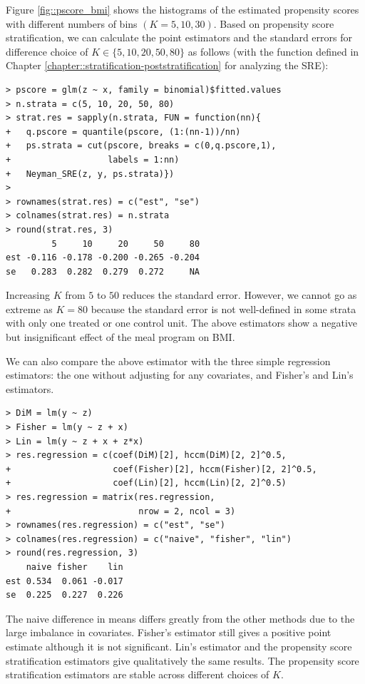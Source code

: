 Figure \ref{fig::pscore_bmi} shows the histograms of the estimated propensity scores with different numbers of bins $(K=5,10,30)$. 
Based on propensity score stratification, we can calculate the point estimators and the standard errors for difference choice of $K \in \{5, 10, 20, 50, 80 \}$ as follows (with the function  defined in Chapter \ref{chapter::stratification-poststratification} for analyzing the SRE):
\begin{lstlisting}
> pscore = glm(z ~ x, family = binomial)$fitted.values
> n.strata = c(5, 10, 20, 50, 80)
> strat.res = sapply(n.strata, FUN = function(nn){
+   q.pscore = quantile(pscore, (1:(nn-1))/nn)
+   ps.strata = cut(pscore, breaks = c(0,q.pscore,1), 
+                   labels = 1:nn)
+   Neyman_SRE(z, y, ps.strata)})
> 
> rownames(strat.res) = c("est", "se")
> colnames(strat.res) = n.strata
> round(strat.res, 3)
         5     10     20     50     80
est -0.116 -0.178 -0.200 -0.265 -0.204
se   0.283  0.282  0.279  0.272     NA
\end{lstlisting}
Increasing $K$ from $5$ to $50$ reduces the standard error. However, we cannot go as extreme as $K=80$ because the standard error is not well-defined in some strata with only one treated or one control unit. The above estimators show a negative but insignificant effect of the meal program on  BMI. 


We can also compare the above estimator with the three simple regression estimators: the one without adjusting for any covariates, and Fisher's and Lin's estimators. 
\begin{lstlisting}
> DiM = lm(y ~ z)
> Fisher = lm(y ~ z + x)
> Lin = lm(y ~ z + x + z*x)
> res.regression = c(coef(DiM)[2], hccm(DiM)[2, 2]^0.5,
+                    coef(Fisher)[2], hccm(Fisher)[2, 2]^0.5,
+                    coef(Lin)[2], hccm(Lin)[2, 2]^0.5)
> res.regression = matrix(res.regression,
+                         nrow = 2, ncol = 3)
> rownames(res.regression) = c("est", "se")
> colnames(res.regression) = c("naive", "fisher", "lin")
> round(res.regression, 3)   
    naive fisher    lin
est 0.534  0.061 -0.017
se  0.225  0.227  0.226
\end{lstlisting} 
The naive difference in means differs greatly from the other methods due to the large imbalance in covariates. Fisher's estimator still gives a positive point estimate although it is not significant. Lin's estimator and the propensity score stratification estimators give qualitatively the same results. The propensity score stratification estimators are stable across different choices of $K$. 




